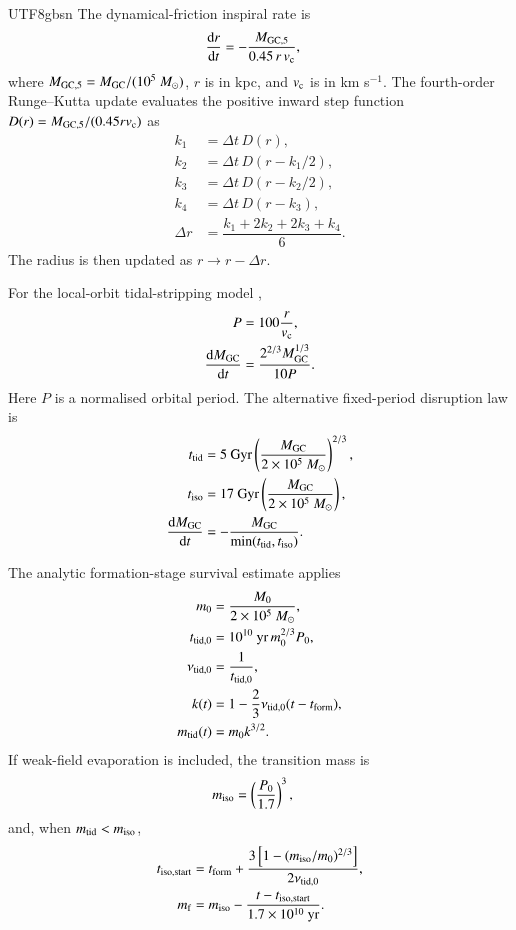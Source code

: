 \documentclass[trackchanges, twocolappendix, twocolumn]{aastex701}
\begin{document}
\begin{CJK*}{UTF8}{gbsn}
The dynamical-friction inspiral rate is
\begin{align}
\dfrac{\mathrm{d}r}{\mathrm{d}t} &=
-\dfrac{M_{\rm GC,5}}{0.45\,r\,v_{\rm c}},
\end{align}
where $M_{\rm GC,5}=M_{\rm GC}/(10^5~M_\odot)$, $r$ is in kpc, and $v_{\rm c}$ is in km s$^{-1}$. The fourth-order Runge--Kutta update evaluates the positive inward step function $D(r)=M_{\rm GC,5}/(0.45rv_{\rm c})$ as
\begin{align}
k_1 &= \Delta t\,D(r),\\
k_2 &= \Delta t\,D(r-k_1/2),\\
k_3 &= \Delta t\,D(r-k_2/2),\\
k_4 &= \Delta t\,D(r-k_3),\\
\Delta r &= \dfrac{k_1+2k_2+2k_3+k_4}{6}.
\end{align}
The radius is then updated as $r\rightarrow r-\Delta r$.

For the local-orbit tidal-stripping model \citep{Fragione+2019GC},
\begin{align}
P &= 100 \dfrac{r}{v_{\rm c}} , \\
\dfrac{\mathrm{d} M_{\rm GC}}{\mathrm{d} t} & = \dfrac{2^{2/3} M_{\rm GC}^{1/3}}{10 P} .
\end{align}
Here $P$ is a normalised orbital period. The alternative fixed-period disruption law is \citep{Choksi+2018GC}
\begin{align}
t_{\rm tid} & = 5~{\rm Gyr} \left( \dfrac{M_{\rm GC}}{2 \times 10^5~M_\odot} \right)^{2/3} , \\
t_{\rm iso} & = 17~{\rm Gyr} \left( \dfrac{M_{\rm GC}}{2 \times 10^5~M_\odot} \right) , \\
\dfrac{\mathrm{d} M_{\rm GC}}{\mathrm{d} t} & = - \dfrac{M_{\rm GC}}{\min(t_{\rm tid}, t_{\rm iso})} .
\end{align}

The analytic formation-stage survival estimate applies
\begin{align}
m_0 &= \dfrac{M_0}{2\times10^5~M_\odot},\\
t_{\rm tid,0} &= 10^{10}~{\rm yr}\,m_0^{2/3}P_0,\\
\nu_{\rm tid,0} &= \dfrac{1}{t_{\rm tid,0}},\\
k(t) &= 1-\dfrac{2}{3}\nu_{\rm tid,0}(t-t_{\rm form}),\\
m_{\rm tid}(t) &= m_0 k^{3/2}.
\end{align}
If weak-field evaporation is included, the transition mass is
\begin{align}
m_{\rm iso} &= \left(\dfrac{P_0}{1.7}\right)^3,
\end{align}
and, when $m_{\rm tid}<m_{\rm iso}$,
\begin{align}
t_{\rm iso,start} &=
t_{\rm form}
+\dfrac{3\left[1-(m_{\rm iso}/m_0)^{2/3}\right]}
{2\nu_{\rm tid,0}},\\
m_{\rm f} &=
m_{\rm iso}
-\dfrac{t-t_{\rm iso,start}}{1.7\times10^{10}~{\rm yr}}.
\end{align}


\end{CJK*}
\end{document}
